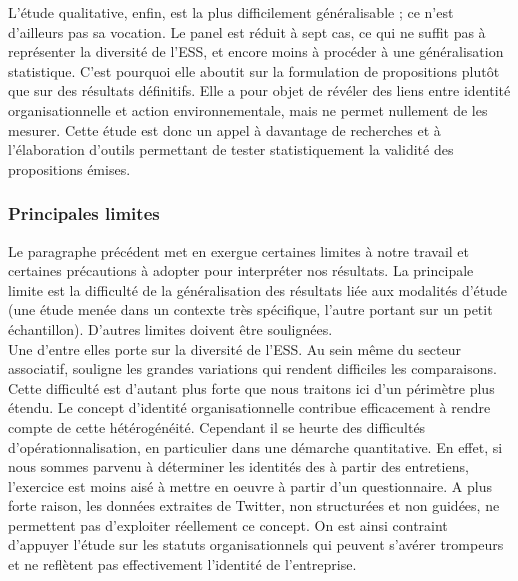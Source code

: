         L'étude qualitative, enfin, est la plus difficilement généralisable ; ce n'est d'ailleurs pas sa vocation. Le panel est réduit à sept cas, ce qui ne suffit pas à représenter la diversité de l'ESS, et encore moins à procéder à une généralisation statistique. C'est pourquoi elle aboutit sur la formulation de propositions plutôt que sur des résultats définitifs. Elle a pour objet de révéler des liens entre identité organisationnelle et action environnementale, mais ne permet nullement de les mesurer. Cette étude est donc un appel à davantage de recherches et à l'élaboration d'outils permettant de tester statistiquement la validité des propositions émises.

        \subsubsection{Principales limites}

        Le paragraphe précédent met en exergue certaines limites à notre travail et certaines précautions à adopter pour interpréter nos résultats. La principale limite est la difficulté de la généralisation des résultats liée aux modalités d'étude (une étude menée dans un contexte très spécifique, l'autre portant sur un petit échantillon). D'autres limites doivent être soulignées. \\

        Une d'entre elles porte sur la diversité de l'ESS. Au sein même du secteur associatif, \textcite{valeau2003differentes} souligne les grandes variations qui rendent difficiles les comparaisons. Cette difficulté est d'autant plus forte que nous traitons ici d'un périmètre plus étendu. Le concept d'identité organisationnelle contribue efficacement à rendre compte de cette hétérogénéité. Cependant il se heurte des difficultés d'opérationnalisation, en particulier dans une démarche quantitative. En effet, si nous sommes parvenu à déterminer les identités des \oess à partir des entretiens, l'exercice est moins aisé à mettre en oeuvre à partir d'un questionnaire. A plus forte raison, les données extraites de Twitter, non structurées et non guidées, ne permettent pas d'exploiter réellement ce concept. On est ainsi contraint d'appuyer l'étude sur les statuts organisationnels qui peuvent s'avérer trompeurs et ne reflètent pas effectivement l'identité de l'entreprise. \\

